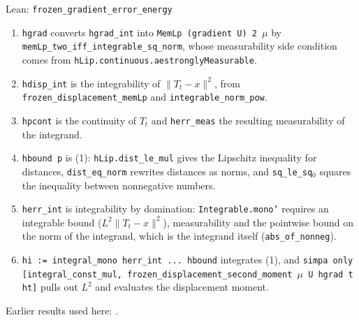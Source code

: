 \documentclass[11pt,a4paper]{report}
\begin{document}
\begin{leanbox}{Lean: \texttt{frozen\_\allowbreak{}gradient\_\allowbreak{}error\_\allowbreak{}energy}}
\begin{enumerate}


\item \texttt{hgrad} converts \texttt{hgrad\_\allowbreak{}int} into \texttt{Mem\allowbreak{}Lp (gradient U) 2 \ensuremath{\mu}} by \texttt{mem\allowbreak{}Lp\_\allowbreak{}two\_\allowbreak{}iff\_\allowbreak{}integrable\_\allowbreak{}sq\_\allowbreak{}norm}, whose measurability side condition comes from \texttt{h\allowbreak{}Lip.\allowbreak{}continuous.\allowbreak{}aestrongly\allowbreak{}Measurable}.

\item \texttt{hdisp\_\allowbreak{}int} is the integrability of \(\|T_t-x\|^2\), from \texttt{frozen\_\allowbreak{}displacement\_\allowbreak{}mem\allowbreak{}Lp} and \texttt{integrable\_\allowbreak{}norm\_\allowbreak{}pow}.

\item \texttt{hpcont} is the continuity of \(T_t\) and \texttt{herr\_\allowbreak{}meas} the resulting measurability of the integrand.

\item \texttt{hbound p} is (1): \texttt{h\allowbreak{}Lip.\allowbreak{}dist\_\allowbreak{}le\_\allowbreak{}mul} gives the Lipschitz inequality for distances, \texttt{dist\_\allowbreak{}eq\_\allowbreak{}norm} rewrites distances as norms, and \texttt{sq\_\allowbreak{}le\_\allowbreak{}sq\ensuremath{{}_{0}}} squares the inequality between nonnegative numbers.

\item \texttt{herr\_\allowbreak{}int} is integrability by domination: \texttt{Integrable.\allowbreak{}mono'} requires an integrable bound (\(L^2\|T_t-x\|^2\)), measurability and the pointwise bound on the norm of the integrand, which is the integrand itself (\texttt{abs\_\allowbreak{}of\_\allowbreak{}nonneg}).

\item \texttt{hi := integral\_\allowbreak{}mono herr\_\allowbreak{}int .\allowbreak{}.\allowbreak{}.\allowbreak{} hbound} integrates (1), and \texttt{simpa only [integral\_\allowbreak{}const\_\allowbreak{}mul, frozen\_\allowbreak{}displacement\_\allowbreak{}second\_\allowbreak{}moment \ensuremath{\mu} U hgrad t ht]} pulls out \(L^2\) and evaluates the displacement moment.

\end{enumerate}
\end{leanbox}


Earlier results used here: \cite[Section~3.34.1]{LangevinLean2026ULASC}.
\end{document}

